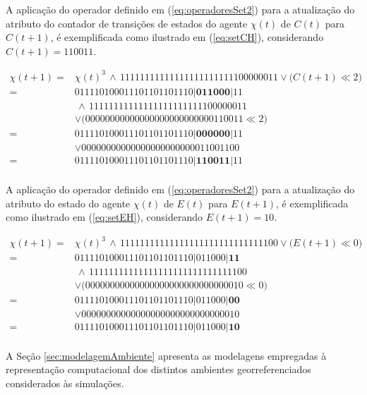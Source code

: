 A aplicação do operador definido em (\ref{eq:operadoresSet2}) para a atualização do atributo do contador de transições de estados do agente $\chi(t)$ de $C(t)$ para $C(t + 1)$, é exemplificada como ilustrado em (\ref{eq:setCH}), considerando $C(t + 1) = 1 1 0 0 1 1$.

\begin{equation}
 \begin{split}
 \chi(t + 1)   = & \chi(t)^3 \, \wedge \, 11111111111111111111111100000011 \vee \big(C(t + 1) \ll 2\big) \\
	       = & 0 1 1 1 1 0 1 0 0 0 1 1 1 0 1 1 0 1 1 0 1 1 1 0 | \boldsymbol{0 1 1 0 0 0} | 1 1 \\
	         & \, \wedge \, 11111111111111111111111100000011 \\
	         & \vee \big(00000000000000000000000000110011 \ll 2\big) \\
	       = & 0 1 1 1 1 0 1 0 0 0 1 1 1 0 1 1 0 1 1 0 1 1 1 0 | \boldsymbol{0 0 0 0 0 0} | 1 1 \\
	         & \vee 00000000000000000000000011001100 \\
	       = & 0 1 1 1 1 0 1 0 0 0 1 1 1 0 1 1 0 1 1 0 1 1 1 0 | \boldsymbol{1 1 0 0 1 1} | 1 1 \\
 \label{eq:setCH}
 \end{split}
\end{equation}

A aplicação do operador definido em (\ref{eq:operadoresSet2}) para a atualização do atributo do estado do agente $\chi(t)$ de $E(t)$ para $E(t + 1)$, é exemplificada como ilustrado em (\ref{eq:setEH}), considerando $E(t + 1) = 1 0$.

\begin{equation}
 \begin{split}
 \chi(t + 1)   = & \chi(t)^3 \, \wedge \, 11111111111111111111111111111100 \vee \big(E(t + 1) \ll 0\big) \\
	       = & 0 1 1 1 1 0 1 0 0 0 1 1 1 0 1 1 0 1 1 0 1 1 1 0 | 0 1 1 0 0 0 | \boldsymbol{1 1} \\
	         & \, \wedge \, 11111111111111111111111111111100 \\
	         & \vee \big(00000000000000000000000000000010 \ll 0\big) \\
	       = & 0 1 1 1 1 0 1 0 0 0 1 1 1 0 1 1 0 1 1 0 1 1 1 0 | 0 1 1 0 0 0 | \boldsymbol{0 0} \\
	         & \vee 00000000000000000000000000000010 \\
	       = & 0 1 1 1 1 0 1 0 0 0 1 1 1 0 1 1 0 1 1 0 1 1 1 0 | 0 1 1 0 0 0 | \boldsymbol{1 0} \\
 \label{eq:setEH}
 \end{split}
\end{equation}

A Seção \ref{sec:modelagemAmbiente} apresenta as modelagens empregadas à representação computacional dos distintos ambientes georreferenciados considerados às simulações.

\newpage
